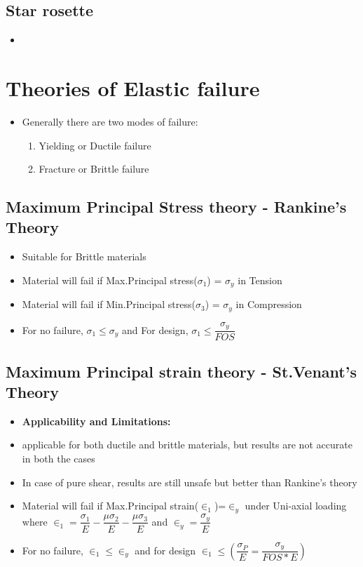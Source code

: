\documentclass[8pt]{report}
\begin{document}
	\subsection{Star rosette}
		\begin{itemize}
			\item
		\end{itemize}\hrulefill
	\section{Theories of Elastic failure}
		\begin{itemize}
			\item Generally there are two modes of failure:
				\begin{enumerate}
					\item Yielding or Ductile failure
					\item Fracture or Brittle failure
				\end{enumerate}
		\end{itemize}
		\subsection{Maximum Principal Stress theory - Rankine's Theory}
			\begin{itemize}
				\item Suitable for Brittle materials
				\item Material will fail if Max.Principal stress($\sigma_1$) = $\sigma_y$ in Tension
				\item Material will fail if Min.Principal stress($\sigma_3$) = $\sigma_y$ in Compression
				\item For no failure, $\sigma_1\le\sigma_y$ and For design, $\sigma_1\le\dfrac{\sigma_y}{FOS}$		
			\end{itemize}\hrulefill
		\subsection{Maximum Principal strain theory - St.Venant's Theory}
			\begin{itemize}
				\item \textbf{Applicability and Limitations:}
				\item applicable for both ductile and brittle materials, but results are not accurate in both the cases
				\item In case of pure shear, results are still unsafe but better than Rankine's theory
				\item Material will fail if Max.Principal strain($\in_1$)=$\in_y$ under Uni-axial loading where $\boxed{\in_1=\dfrac{\sigma_1}{E}-\dfrac{\mu\sigma_2}{E}-\dfrac{\mu\sigma_3}{E}}$ and ${\in_y = \dfrac{\sigma_y}{E}}$
				\item For no failure, $\in_1\le\in_y$ and for design $\in_1\le\left(\dfrac{\sigma_P}{E}=\dfrac{\sigma_y}{FOS*E}\right)$
			\end{itemize}\hrulefill
\end{document}
